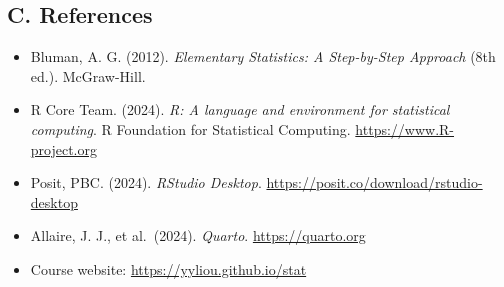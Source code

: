 \documentclass[
]{article}
\providecommand{\tightlist}{%
  \setlength{\itemsep}{0pt}\setlength{\parskip}{0pt}}
\begin{document}
\subsection{C. References}\label{c.-references}

\begin{itemize}
\tightlist
\item
  Bluman, A. G. (2012). \emph{Elementary Statistics: A Step-by-Step
  Approach} (8th ed.). McGraw-Hill.
\item
  R Core Team. (2024). \emph{R: A language and environment for
  statistical computing}. R Foundation for Statistical Computing.
  \url{https://www.R-project.org}
\item
  Posit, PBC. (2024). \emph{RStudio Desktop}.
  \url{https://posit.co/download/rstudio-desktop}
\item
  Allaire, J. J., et al.~(2024). \emph{Quarto}. \url{https://quarto.org}
\item
  Course website: \url{https://yyliou.github.io/stat}
\end{itemize}
\end{document}
